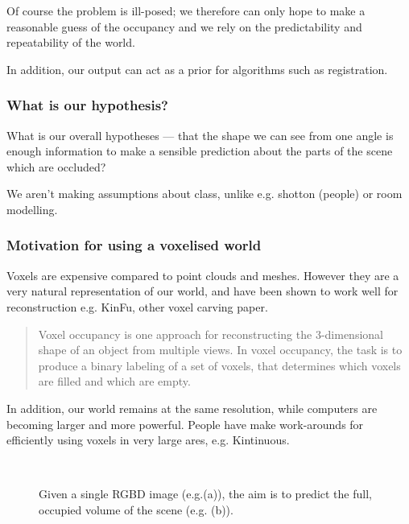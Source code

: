 \documentclass[10pt,a4paper, twocolumn]{article}
\makeatletter
\newcommand*{\eg}{e.g.\@\xspace}
\makeatother
\begin{document}
Of course the problem is ill-posed; we therefore can only hope to make a reasonable guess of the occupancy and we rely on the predictability and repeatability of the world.

In addition, our output can act as a prior for algorithms such as registration.


\subsubsection{What is our hypothesis?}

What is our overall hypotheses --- that the shape we can see from one angle is enough information to make a sensible prediction about the parts of the scene which are occluded?

We aren't making assumptions about class, unlike \eg shotton (people) or room modelling.

\subsubsection{Motivation for using a voxelised world}

Voxels are expensive compared to point clouds and meshes. 
However they are a very natural representation of our world, and have been shown to work well for reconstruction \eg KinFu, other voxel carving paper. 

\begin{quote}
Voxel occupancy is one approach for reconstructing the 3-dimensional shape of an object from multiple views. In voxel occupancy, the task is to produce a binary labeling of a set of voxels, that determines which voxels are filled and which are empty.

\cite{snow-cvpr-2000}
\end{quote}

In addition, our world remains at the same resolution, while computers are becoming larger and more powerful. 
People have make work-arounds for efficiently using voxels in very large ares, \eg Kintinuous.


\begin{figure}
	\centering 
		\hfill
	 \\
	\caption{Given a single RGBD image (\eg (a)), the aim is to predict the full, occupied volume of the scene (e.g. (b)).}
\end{figure}
\end{document}

